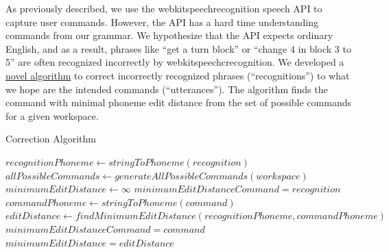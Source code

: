 \documentclass[]{article}
\begin{document}
As previously described, we use the webkitspeechrecognition speech API to capture user commands. However, the API has a hard time understanding commands from our grammar. We hypothesize that the API expects ordinary English, and as a result, phrases like ``get a turn block'' or ``change 4 in block 3 to 5'' are often recognized incorrectly by webkitspeechcrecognition. We developed a \hyperref[CorrectionAlgorithm]{novel algorithm} to correct incorrectly recognized phrases (``recognitions'') to what we hope are the intended commands (``utterances''). The algorithm finds the command with minimal phoneme edit distance from the set of possible commands for a given workspace.
\begin{algorithm}
	\caption{Correction Algorithm}\label{CorrectionAlgorithm}
	\begin{algorithmic}[1]
		\State $recognitionPhoneme \leftarrow stringToPhoneme(recognition)$
		\State $allPossibleCommands\leftarrow generateAllPossibleCommands(workspace) $
		\State $minimumEditDistance \leftarrow \infty$
		\State $minimumEditDistanceCommand = recognition$
			\State $commandPhoneme \leftarrow stringToPhoneme(command)$
			\State $editDistance \leftarrow findMinimumEditDistance(recognitionPhoneme, commandPhoneme)$
				\State $minimumEditDistanceCommand = command$
				\State $minimumEditDistance = editDistance$
			\EndIf
		\EndFor
		\State {}
		\EndProcedure
	\end{algorithmic}
\end{algorithm}\\
\end{document}
